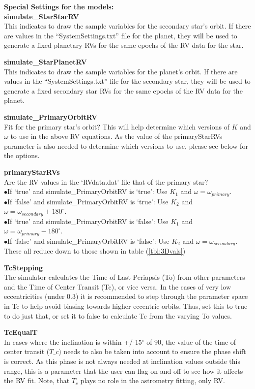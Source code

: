 \documentclass[12pt,preprint]{aastex}
\begin{document}
{\bf \color{blue} Special Settings for the models: }\\
{\bf simulate\_StarStarRV}\\
This indicates to draw the sample variables for the secondary star's orbit.  If there are values in the ``SystemSettings.txt'' file for the planet, they will be used to generate a fixed planetary RVs for the same epochs of the RV data for the star.

{\bf simulate\_StarPlanetRV}\\
This indicates to draw the sample variables for the planet's orbit.  If there are values in the ``SystemSettings.txt'' file for the secondary star, they will be used to generate a fixed secondary star RVs for the same epochs of the RV data for the planet.

{\bf simulate\_PrimaryOrbitRV}\\
Fit for the primary star's orbit?  This will help determine which versions of $K$ and $\omega$ to use in the above RV equations.  As the value of the primaryStarRVs parameter is also needed to determine which versions to use, please see below for the options.

{\bf primaryStarRVs}\\
Are the RV values in the `RVdata.dat' file that of the primary star?  \\
$\bullet$If `true' and simulate\_PrimaryOrbitRV is `true': Use $K_1$ and $\omega = \omega_{primary}$.\\
$\bullet$If `false' and simulate\_PrimaryOrbitRV is `true': Use $K_2$ and $\omega = \omega_{secondary}+180^{\circ}.$\\
$\bullet$If `true' and simulate\_PrimaryOrbitRV is `false': Use $K_1$ and $\omega = \omega_{primary}-180^{\circ}$.\\
$\bullet$If `false' and simulate\_PrimaryOrbitRV is `false': Use $K_2$ and $\omega = \omega_{secondary}$.\\
These all reduce down to those shown in table (\ref{tbl:3Dvals})

{\bf TcStepping}\\
The simulator calculates the Time of Last Periapsis (To) from other parameters and the Time of Center Transit (Tc), or vice versa.  In the cases of very low eccentricities (under 0.3) it is recommended to step through the parameter space in Tc to help avoid biasing towards higher eccentric orbits.  Thus, set this to true to do just that, or set it to false to calculate Tc from the varying To values.

{\bf TcEqualT}\\
In cases where the inclination is within +/-15$^{\circ}$ of 90, the value of the time of center transit ($T\_c$) needs to also be taken into account to ensure the phase shift is correct.  As this phase is not always needed at inclination values outside this range, this is a parameter that the user can flag on and off to see how it affects the RV fit.  Note, that $T_c$ plays no role in the astrometry fitting, only RV.
\end{document}
